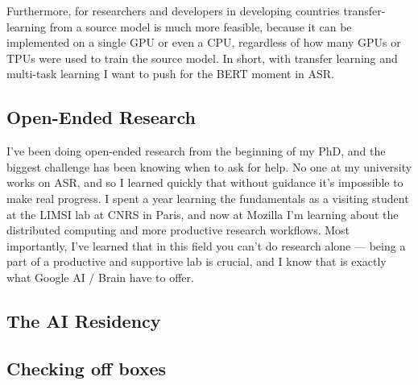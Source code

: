 \documentclass[12pt,a4paper]{article}
\begin{document}
Furthermore, for researchers and developers in developing countries transfer-learning from a source model is much more feasible, because it can be implemented on a single GPU or even a CPU, regardless of how many GPUs or TPUs were used to train the source model. In short, with transfer learning and multi-task learning I want to push for the BERT moment in ASR.

\subsection*{Open-Ended Research}
I've been doing open-ended research from the beginning of my PhD, and the biggest challenge has been knowing when to ask for help. No one at my university works on ASR, and so I learned quickly that without guidance it's impossible to make real progress. I spent a year learning the fundamentals as a visiting student at the LIMSI lab at CNRS in Paris, and now at Mozilla I'm learning about the distributed computing and more productive research workflows. Most importantly, I've learned that in this field you can't do research alone --- being a part of a productive and supportive lab is crucial, and I know that is exactly what Google AI / Brain have to offer.

\subsection*{The AI Residency}


\newpage

\subsection*{Checking off boxes}
\end{document}
